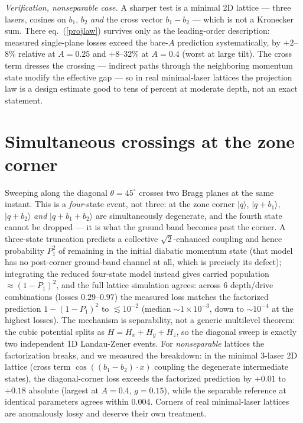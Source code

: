 \documentclass[aps,prb,floatfix,amsmath,amssymb,groupedaddress]{revtex4}
\begin{document}
\emph{Verification, nonseparable case.} A sharper test is a minimal
2D lattice --- three lasers, cosines on $b_1$, $b_2$ \emph{and} the cross
vector $b_1 - b_2$ --- which is not a Kronecker sum. There
eq.~(\ref{projlaw}) survives only as the leading-order description: measured
single-plane losses exceed the bare-$A$ prediction systematically, by
$+2$--$8\%$ relative at $A = 0.25$ and $+8$--$32\%$ at $A = 0.4$ (worst at
large tilt). The cross term dresses the crossing --- indirect paths through
the neighboring momentum state modify the effective gap --- so in real
minimal-laser lattices the projection law is a design estimate good to tens
of percent at moderate depth, not an exact statement.

\section{Simultaneous crossings at the zone corner}

Sweeping along the diagonal $\theta = 45^\circ$ crosses two Bragg planes at
the same instant. This is a \emph{four}-state event, not three: at the zone
corner $|q\rangle$, $|q{+}b_1\rangle$, $|q{+}b_2\rangle$ \emph{and}
$|q{+}b_1{+}b_2\rangle$ are simultaneously degenerate, and the fourth state
cannot be dropped --- it is what the ground band becomes past the corner. A
three-state truncation predicts a collective $\sqrt2$-enhanced coupling and
hence probability $P_1^2$ of remaining in the initial diabatic momentum
state (that model has no post-corner ground-band channel at all, which is
precisely its defect); integrating the reduced four-state model instead
gives carried population $\approx (1-P_1)^2$, and the full lattice
simulation agrees:
across 6 depth/drive combinations (losses $0.29$--$0.97$) the measured loss
matches the factorized prediction $1-(1-P_1)^2$ to $\lesssim 10^{-2}$
(median $\sim 1\times10^{-3}$, down to $\sim 10^{-4}$ at the highest
losses). The mechanism is separability, not a generic
multilevel theorem: the cubic potential splits as $H = H_x + H_y + H_z$, so
the diagonal sweep is exactly two independent 1D Landau-Zener events. For
\emph{nonseparable} lattices the factorization breaks, and we measured the
breakdown: in the minimal 3-laser 2D lattice (cross term
$\cos((b_1{-}b_2)\cdot x)$ coupling the degenerate intermediate states), the
diagonal-corner loss exceeds the factorized prediction by $+0.01$ to $+0.18$
absolute (largest at $A = 0.4$, $g = 0.15$), while the separable reference
at identical parameters agrees within $0.004$. Corners of real
minimal-laser lattices are anomalously lossy and deserve their own
treatment.
\end{document}
